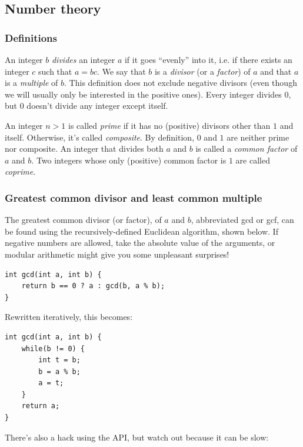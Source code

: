 \documentclass[a4paper,12pt]{article}
\begin{document}
\subsection{Number theory}

\subsubsection{Definitions}

An integer $b$ {\em divides} an integer $a$ if it goes ``evenly'' into it, i.e. if there exists an integer $c$ such that $a=bc$. We say that $b$ is a {\em divisor} (or a {\em factor}) of $a$ and that $a$ is a {\em multiple} of $b$. This definition does not exclude negative divisors (even though we will usually only be interested in the positive ones). Every integer divides $0$, but $0$ doesn't divide any integer except itself.

An integer $n>1$ is called {\em prime} if it has no (positive) divisors other than $1$ and itself. Otherwise, it's called {\em composite}. By definition, $0$ and $1$ are neither prime nor composite. An integer that divides both $a$ and $b$ is called a {\em common factor} of $a$ and $b$. Two integers whose only (positive) common factor is $1$ are called {\em coprime}.

\subsubsection{Greatest common divisor and least common multiple}

\noindent The greatest common divisor (or factor), of $a$ and $b$, abbreviated gcd or gcf, can be found using the recursively-defined Euclidean algorithm, shown below. If negative numbers are allowed, take the absolute value of the arguments, or modular arithmetic might give you some unpleasant surprises!

\begin{lstlisting}
int gcd(int a, int b) {
	return b == 0 ? a : gcd(b, a % b);
}
\end{lstlisting}

\noindent Rewritten iteratively, this becomes:

\begin{lstlisting}
int gcd(int a, int b) {
	while(b != 0) {
		int t = b;
		b = a % b;
		a = t;
	}
	return a;
}
\end{lstlisting}

\noindent There's also a hack using the API, but watch out because it can be slow:
\end{document}
